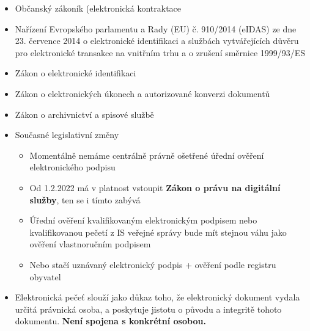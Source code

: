\begin{itemize}
\begin{enumerate}
\begin{itemize}
                        \end{itemize}
            \end{enumerate}
      \item Občanský zákoník (elektronická kontraktace
      \item Nařízení Evropského parlamentu a Rady (EU) č. 910/2014 (eIDAS) ze dne 23. července 2014 o elektronické identifikaci
            a službách vytvářejících důvěru pro elektronické transakce na vnitřním trhu a o zrušení směrnice 1999/93/ES
      \item Zákon o elektronické identifikaci
      \item Zákon o elektronických úkonech a autorizované konverzi dokumentů
      \item Zákon o archivnictví a spisové službě
      \item Současné legislativní změny
      \begin{itemize}
          \item Momentálně nemáme centrálně právně ošetřené úřední ověření elektronického podpisu
          \item Od 1.2.2022 má v platnost vstoupit \textbf{Zákon o právu na digitální služby}, ten se i tímto zabývá
          \item Úřední ověření kvalifikovaným elektronickým podpisem nebo kvalifikovanou pečetí z IS veřejné správy bude mít stejnou váhu jako ověření vlastnoručním podpisem
          \item Nebo stačí uznávaný elektronický podpis + ověření podle registru obyvatel
      \end{itemize}
      \item  Elektronická pečeť slouží jako důkaz toho, že elektronický dokument vydala určitá právnická osoba, a poskytuje jistotu o původu a integritě tohoto dokumentu. \textbf{Není spojena s konkrétní osobou.}
\end{itemize}


